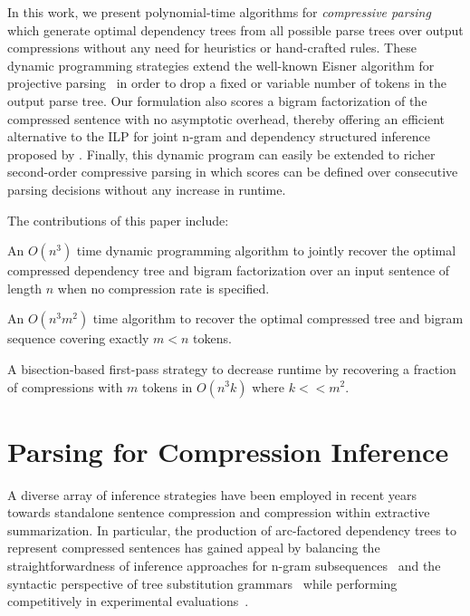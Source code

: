 \documentclass[11pt,a4paper]{article}
\newenvironment{packed_itemize}{
\begin{itemize}
  \setlength{\itemsep}{1pt}
  \setlength{\parskip}{0pt}
  \setlength{\parsep}{0pt}
}{\end{itemize}}
\begin{document}
In this work, we present polynomial-time algorithms for
\emph{compressive parsing} which generate optimal dependency trees
from all possible parse trees over output compressions without any need for
heuristics or hand-crafted rules.
These dynamic programming strategies extend the well-known Eisner
algorithm for projective parsing~\cite{eisner96}
in order to drop a fixed or variable number of tokens
in the output parse tree.
Our formulation also scores a bigram
factorization of the compressed sentence with no asymptotic overhead,
thereby offering an efficient alternative to the ILP for joint n-gram and
dependency structured inference proposed by .
Finally, this dynamic program can easily be extended to richer
second-order compressive parsing \cite{eisner96,mcdonald06b} in
which scores can be defined over consecutive parsing decisions without
any increase in runtime.

The contributions of this paper include:
\begin{packed_itemize}
\item An $O(n^3)$ time dynamic programming algorithm to jointly recover the
    optimal compressed dependency tree and bigram factorization over an
    input sentence of length $n$ when no compression rate is specified.
\item An $O(n^3m^2)$ time algorithm to recover the optimal compressed
    tree and bigram sequence covering exactly $m < n$ tokens.
\item A bisection-based first-pass strategy to decrease runtime
    by recovering a fraction of compressions with $m$ tokens in
    $O(n^3k)$ where $k << m^2$.
\end{packed_itemize}

\section{Parsing for Compression Inference}
\label{parsing}

A diverse array of inference strategies have been employed in recent
years towards standalone sentence compression and compression within
extractive summarization. In particular, the production of
arc-factored dependency trees to represent compressed sentences
has gained appeal by balancing the straightforwardness
of inference approaches for n-gram subsequences~\cite{mcdonald06a,clarke08}
and the syntactic perspective of tree substitution
grammars~\cite{cohn09,woodsend12} while performing competitively in
experimental evaluations~\cite{galanis10,qian13,thadani14}.
\end{document}
